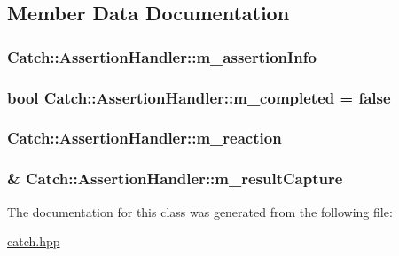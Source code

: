 \subsection{Member Data Documentation}
\hypertarget{class_catch_1_1_assertion_handler_ad171e8724bb771d97949b7270f400303}{
\subsubsection[{m\-\_\-assertion\-Info}]{ Catch\-::\-Assertion\-Handler\-::m\-\_\-assertion\-Info\hspace{0.3cm}{\ttfamily [private]}}}\label{class_catch_1_1_assertion_handler_ad171e8724bb771d97949b7270f400303}
\hypertarget{class_catch_1_1_assertion_handler_a5a756818dff781c155e8eb970d1d4c68}{
\subsubsection[{m\-\_\-completed}]{\setlength{\rightskip}{0pt plus 5cm}bool Catch\-::\-Assertion\-Handler\-::m\-\_\-completed = false\hspace{0.3cm}{\ttfamily [private]}}}\label{class_catch_1_1_assertion_handler_a5a756818dff781c155e8eb970d1d4c68}
\hypertarget{class_catch_1_1_assertion_handler_a8203c08a43a3761b5f400ee6587fad55}{
\subsubsection[{m\-\_\-reaction}]{ Catch\-::\-Assertion\-Handler\-::m\-\_\-reaction\hspace{0.3cm}{\ttfamily [private]}}}\label{class_catch_1_1_assertion_handler_a8203c08a43a3761b5f400ee6587fad55}
\hypertarget{class_catch_1_1_assertion_handler_aea5283ee36124ce5c51dc2a697b22a39}{
\subsubsection[{m\-\_\-result\-Capture}]{\& Catch\-::\-Assertion\-Handler\-::m\-\_\-result\-Capture\hspace{0.3cm}{\ttfamily [private]}}}\label{class_catch_1_1_assertion_handler_aea5283ee36124ce5c51dc2a697b22a39}


The documentation for this class was generated from the following file\-:\begin{DoxyCompactItemize}
\item 
\hyperlink{catch_8hpp}{catch.\-hpp}\end{DoxyCompactItemize}
